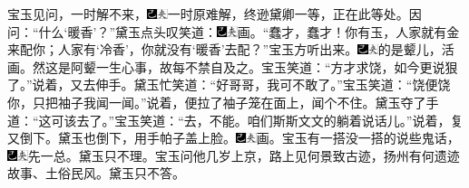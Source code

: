 宝玉见问，一时解不来，{\includegraphics[width=3mm]{../Images/00003}\includegraphics[width=3mm]{../Images/00012}\footnotesize \kaishu 一时原难解，终逊黛卿一等，正在此等处。}因问：“什么‘暖香’？”黛玉点头叹笑道：{\includegraphics[width=3mm]{../Images/00003}\includegraphics[width=3mm]{../Images/00012}\footnotesize \kaishu 画。}“蠢才，蠢才！你有玉，人家就有金来配你；人家有‘冷香’，你就没有‘暖香’去配？”宝玉方听出来。{\includegraphics[width=3mm]{../Images/00003}\includegraphics[width=3mm]{../Images/00012}\footnotesize \kaishu 的是颦儿，活画。然这是阿颦一生心事，故每不禁自及之。}宝玉笑道：“方才求饶，如今更说狠了。”说着，又去伸手。黛玉忙笑道：“好哥哥，我可不敢了。”宝玉笑道：“饶便饶你，只把袖子我闻一闻。”说着，便拉了袖子笼在面上，闻个不住。黛玉夺了手道：“这可该去了。”宝玉笑道：“去，不能。咱们斯斯文文的躺着说话儿。”说着，复又倒下。黛玉也倒下，用手帕子盖上脸。{\includegraphics[width=3mm]{../Images/00003}\includegraphics[width=3mm]{../Images/00012}\footnotesize \kaishu 画。}宝玉有一搭没一搭的说些鬼话，{\includegraphics[width=3mm]{../Images/00003}\includegraphics[width=3mm]{../Images/00012}\footnotesize \kaishu 先一总。}黛玉只不理。宝玉问他几岁上京，路上见何景致古迹，扬州有何遗迹故事、土俗民风。黛玉只不答。

